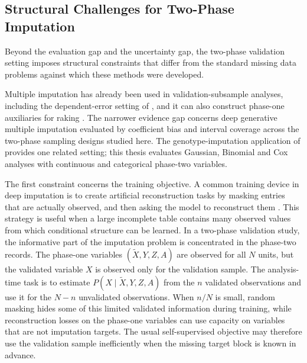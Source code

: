 \subsection{Structural Challenges for Two-Phase Imputation}
\label{sec:3.5.4}
Beyond the evaluation gap and the uncertainty gap, the two-phase validation setting imposes structural constraints that differ from the standard missing data problems against which these methods were developed.

Multiple imputation has already been used in validation-subsample analyses, including the dependent-error setting of \citet{giganti2020accounting}, and it can also construct phase-one auxiliaries for raking \citep{han2021combining}. The narrower evidence gap concerns deep generative multiple imputation evaluated by coefficient bias and interval coverage across the two-phase sampling designs studied here. The genotype-imputation application of \citet{luo2024thesis} provides one related setting; this thesis evaluates Gaussian, Binomial and Cox analyses with continuous and categorical phase-two variables.

The first constraint concerns the training objective. A common training device in deep imputation is to create artificial reconstruction tasks by masking entries that are actually observed, and then asking the model to reconstruct them \citep{ma2023mivae, zheng2022diffusion}. This strategy is useful when a large incomplete table contains many observed values from which conditional structure can be learned. In a two-phase validation study, the informative part of the imputation problem is concentrated in the phase-two records. The phase-one variables $(\tilde{X},Y,Z,A)$ are observed for all $N$ units, but the validated variable $X$ is observed only for the validation sample. The analysis-time task is to estimate $P(X\mid \tilde{X},Y,Z,A)$ from the $n$ validated observations and use it for the $N-n$ unvalidated observations. When $n/N$ is small, random masking hides some of this limited validated information during training, while reconstruction losses on the phase-one variables can use capacity on variables that are not imputation targets. The usual self-supervised objective may therefore use the validation sample inefficiently when the missing target block is known in advance.

